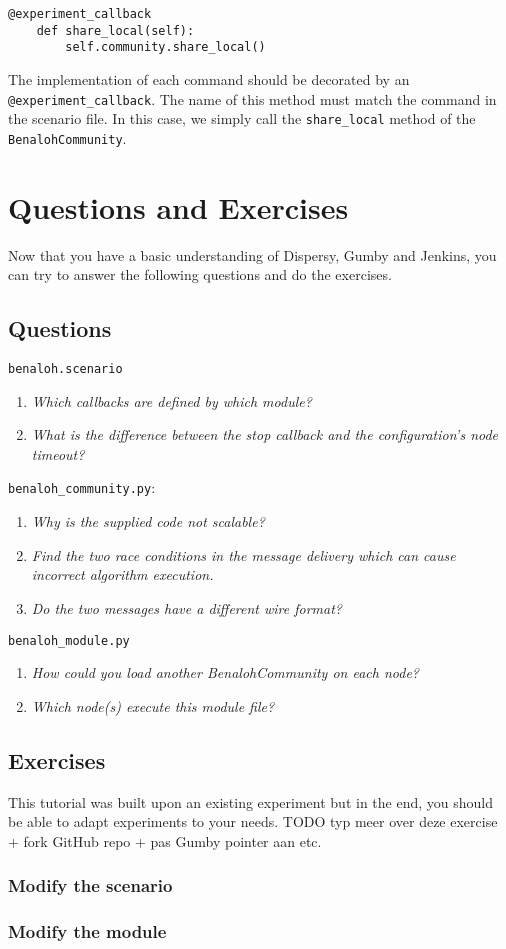 \documentclass{article}
\begin{document}
\begin{lstlisting}[frame=single]
    @experiment_callback
    def share_local(self):
        self.community.share_local()
\end{lstlisting}

The implementation of each command should be decorated by an \texttt{@experiment\_callback}.
The name of this method must match the command in the scenario file.
In this case, we simply call the \texttt{share\_local} method of the \texttt{BenalohCommunity}.

\section{Questions and Exercises}
Now that you have a basic understanding of Dispersy, Gumby and Jenkins, you can try to answer the following questions and do the exercises.

\subsection{Questions}
\texttt{benaloh.scenario}
\begin{enumerate}
\item \textit{Which callbacks are defined by which module?}
\item \textit{What is the difference between the stop callback and the configuration's node timeout?}
\end{enumerate}
\texttt{benaloh\_community.py}:
\begin{enumerate}
\item \textit{Why is the supplied code not scalable?}
\item \textit{Find the two race conditions in the message delivery which can cause incorrect algorithm execution.}
\item \textit{Do the two messages have a different wire format?}
\end{enumerate}
\texttt{benaloh\_module.py}
\begin{enumerate}
\item \textit{How could you load another BenalohCommunity on each node?}
\item \textit{Which node(s) execute this module file?}
\end{enumerate}

\subsection{Exercises}

This tutorial was built upon an existing experiment but in the end, you should be able to adapt experiments to your needs.
TODO typ meer over deze exercise + fork GitHub repo + pas Gumby pointer aan etc.

\subsubsection{Modify the scenario}

\subsubsection{Modify the module}


{\small }
\end{document}
